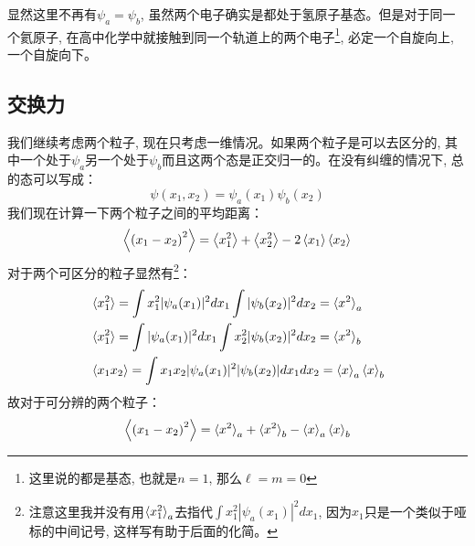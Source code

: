 \documentclass[a4paper,zihao=-4,linespread=1]{ctexrep}
\begin{document}
    显然这里不再有$\psi_a=\psi_b$, 虽然两个电子确实是都处于氢原子基态。但是对于同一个氦原子, 在高中化学中就接触到同一个轨道上的两个电子\footnote{这里说的都是基态, 也就是$n=1$, 那么$\ell=m=0$}, 必定一个自旋向上, 一个自旋向下。
    \subsection{交换力}
    我们继续考虑两个粒子, 现在只考虑一维情况。如果两个粒子是可以去区分的, 其中一个处于$\psi_a$另一个处于$\psi_b$而且这两个态是正交归一的。在没有纠缠的情况下, 总的态可以写成：
    \[\psi(x_1,x_2)=\psi_a(x_1)\psi_b(x_2)\]
    我们现在计算一下两个粒子之间的平均距离：
    \[\Braket{\left(x_1-x_2\right)^2}=\Braket{x_1^2}+\Braket{x_2^2}-2\Braket{x_1}\Braket{x_2}\]
    对于两个可区分的粒子显然有\footnote{注意这里我并没有用$\braket{x_1^2}_a$去指代$\int x_1^2|\psi_a(x_1)|^2dx_1$, 因为$x_1$只是一个类似于哑标的中间记号, 这样写有助于后面的化简。}：
    \begin{align*}
        &\braket{x_1^2}=\int x_1^2|\psi_a(x_1)|^2dx_1\int |\psi_b(x_2)|^2dx_2=\braket{x^2}_a\\
        &\braket{x_1^2}=\int |\psi_a(x_1)|^2dx_1\int x_2^2 |\psi_b(x_2)|^2dx_2=\braket{x^2}_b\\
        &\braket{x_1x_2}=\int x_1x_2|\psi_a(x_1)|^2|\psi_b(x_2)|dx_1dx_2=\braket{x}_a\braket{x}_b
    \end{align*}
    故对于可分辨的两个粒子：
    \begin{equation}
        \label{eq:5.7}
        \Braket{\left(x_1-x_2\right)^2}=\braket{x^2}_a+\braket{x^2}_b-\braket{x}_a\braket{x}_b
    \end{equation}
    
\end{document}
